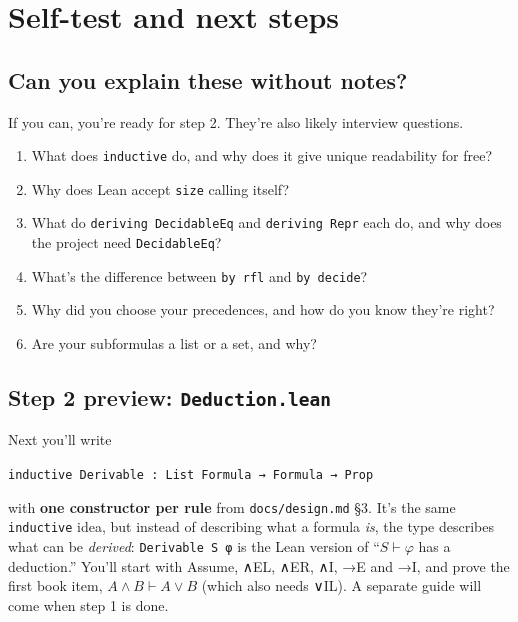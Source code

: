 \documentclass[11pt,a4paper]{article}
\newcommand{\code}[1]{\texttt{#1}}
\begin{document}
\section{Self-test and next steps}

\subsection{Can you explain these without notes?}
If you can, you're ready for step 2. They're also likely interview questions.
\begin{enumerate}
\item What does \code{inductive} do, and why does it give unique readability for free?
\item Why does Lean accept \code{size} calling itself?
\item What do \code{deriving DecidableEq} and \code{deriving Repr} each do, and why does the project need \code{DecidableEq}?
\item What's the difference between \code{by rfl} and \code{by decide}?
\item Why did you choose your precedences, and how do you know they're right?
\item Are your subformulas a list or a set, and why?
\end{enumerate}

\subsection{Step 2 preview: \texttt{Deduction.lean}}
Next you'll write
\begin{center}\code{inductive Derivable : List Formula → Formula → Prop}\end{center}
with \textbf{one constructor per rule} from \code{docs/design.md} §3. It's the same \code{inductive} idea, but instead of describing what a formula \emph{is}, the type describes what can be \emph{derived}: \code{Derivable S φ} is the Lean version of ``$S\vdash\varphi$ has a deduction.'' You'll start with Assume, ∧EL, ∧ER, ∧I, →E and →I, and prove the first book item, $A\wedge B\vdash A\vee B$ (which also needs ∨IL). A separate guide will come when step 1 is done.
\end{document}

